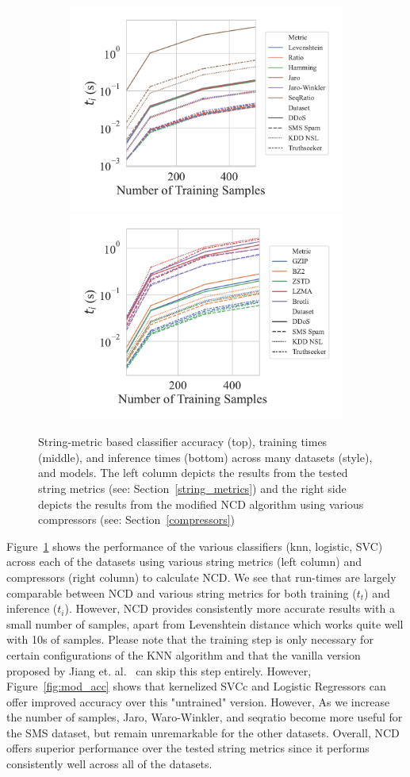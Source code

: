 \documentclass[conference]{IEEEtran}
\begin{document}
\begin{figure}[htb]
    \begin{subfigure}[htb]{\textwidth}
        \includegraphics[width=.45\textwidth]{figs/combined/string_metric_vs_predict_time.pdf}
        \includegraphics[width=.45\textwidth]{figs/combined/compressor_metric_vs_predict_time.pdf}
    \end{subfigure}
    
    \caption{String-metric based classifier accuracy (top), training times (middle), and inference times (bottom) across many datasets (style), and models. The left column depicts the results from the tested string metrics (see: Section~\ref{string_metrics}) and the right side depicts the results from the modified NCD algorithm using various compressors (see: Section~\ref{compressors})}
    \label{fig:models_summary}
\end{figure}

Figure~\ref{fig:models_summary} shows the performance of the various classifiers (knn, logistic, SVC) across each of the datasets using various string metrics (left column) and compressors (right column) to calculate NCD. We see that run-times are largely comparable between NCD and various string metrics for both training ($t_t$) and inference ($t_i$). 
However, NCD provides consistently more accurate results with a small number of samples, apart from Levenshtein distance which works quite well with 10s of samples. 
Please note that the training step is only necessary for certain configurations of the KNN algorithm and that the vanilla version proposed by Jiang et. al.~\cite{jiang2022less} can skip this step entirely. However, Figure~\ref{fig:mod_acc} shows that kernelized SVCc and Logistic Regressors can offer improved accuracy over this "untrained" version.
However, As we increase the number of samples, Jaro, Waro-Winkler, and seqratio become more useful for the SMS dataset, but remain unremarkable for the other datasets. Overall, NCD offers superior performance over the tested string metrics since it performs consistently well across all of the datasets. 
\end{document}
